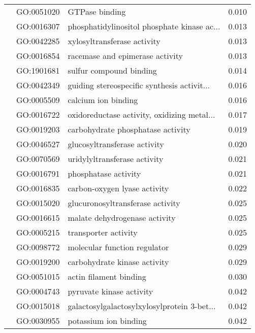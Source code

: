 \begin{longtable}{lllr}
   & GO:0051020 &                               GTPase binding &         0.010 \\
   & GO:0016307 &  phosphatidylinositol phosphate kinase ac... &         0.013 \\
   & GO:0042285 &                  xylosyltransferase activity &         0.013 \\
   & GO:0016854 &              racemase and epimerase activity &         0.013 \\
   & GO:1901681 &                      sulfur compound binding &         0.014 \\
   & GO:0042349 &  guiding stereospecific synthesis activit... &         0.016 \\
   & GO:0005509 &                          calcium ion binding &         0.016 \\
   & GO:0016722 &  oxidoreductase activity, oxidizing metal... &         0.017 \\
   & GO:0019203 &            carbohydrate phosphatase activity &         0.019 \\
   & GO:0046527 &                 glucosyltransferase activity &         0.020 \\
   & GO:0070569 &                 uridylyltransferase activity &         0.021 \\
   & GO:0016791 &                         phosphatase activity &         0.021 \\
   & GO:0016835 &                 carbon-oxygen lyase activity &         0.022 \\
   & GO:0015020 &             glucuronosyltransferase activity &         0.025 \\
   & GO:0016615 &                malate dehydrogenase activity &         0.025 \\
   & GO:0005215 &                         transporter activity &         0.025 \\
   & GO:0098772 &                 molecular function regulator &         0.029 \\
   & GO:0019200 &                 carbohydrate kinase activity &         0.029 \\
   & GO:0051015 &                       actin filament binding &         0.030 \\
   & GO:0004743 &                     pyruvate kinase activity &         0.042 \\
   & GO:0015018 &  galactosylgalactosylxylosylprotein 3-bet... &         0.042 \\
   & GO:0030955 &                        potassium ion binding &         0.042 \\

\end{longtable}
